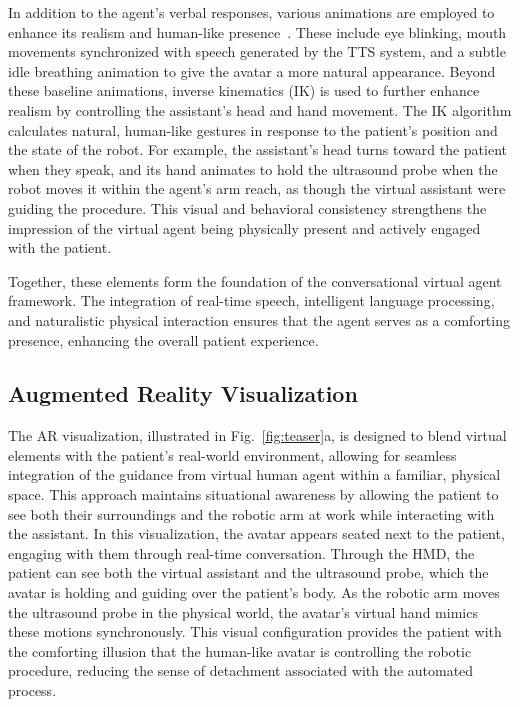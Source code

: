 In addition to the agent’s verbal responses, various animations are employed to enhance its realism and human-like presence~\cite{yu2021avatars}. These include eye blinking, mouth movements synchronized with speech generated by the TTS system, and a subtle idle breathing animation to give the avatar a more natural appearance. Beyond these baseline animations, inverse kinematics (IK) is used to further enhance realism by controlling the assistant’s head and hand movement. The IK algorithm calculates natural, human-like gestures in response to the patient’s position and the state of the robot.  For example, the assistant’s head turns toward the patient when they speak, and its hand animates to hold the ultrasound probe when the robot moves it within the agent’s arm reach, as though the virtual assistant were guiding the procedure. This visual and behavioral consistency strengthens the impression of the virtual agent being physically present and actively engaged with the patient.

Together, these elements form the foundation of the conversational virtual agent framework. The integration of real-time speech, intelligent language processing, and naturalistic physical interaction ensures that the agent serves as a comforting presence, enhancing the overall patient experience.

\subsection{Augmented Reality Visualization}

The AR visualization, illustrated in Fig.~\ref{fig:teaser}a, is designed to blend virtual elements with the patient’s real-world environment, allowing for seamless integration of the guidance from virtual human agent within a familiar, physical space. This approach maintains situational awareness by allowing the patient to see both their surroundings and the robotic arm at work while interacting with the assistant. 
In this visualization, the avatar appears seated next to the patient, engaging with them through real-time conversation. Through the HMD, the patient can see both the virtual assistant and the ultrasound probe, which the avatar is holding and guiding over the patient’s body. As the robotic arm moves the ultrasound probe in the physical world, the avatar’s virtual hand mimics these motions synchronously. This visual configuration provides the patient with the comforting illusion that the human-like avatar is controlling the robotic procedure, reducing the sense of detachment associated with the automated process.


